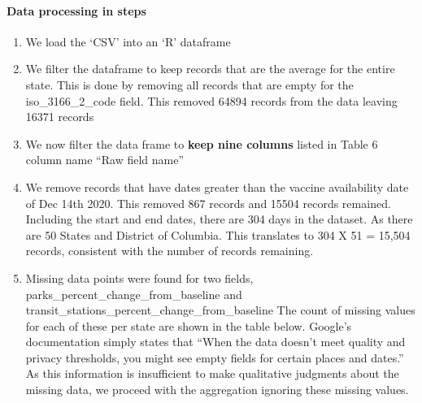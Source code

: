 \documentclass[
]{article}
\providecommand{\tightlist}{%
  \setlength{\itemsep}{0pt}\setlength{\parskip}{0pt}}
\begin{document}
\hypertarget{data-processing-in-steps-2}{%
\paragraph{Data processing in steps}\label{data-processing-in-steps-2}}

\begin{enumerate}
\def\labelenumi{\arabic{enumi}.}
\tightlist
\item
  We load the `CSV' into an `R' dataframe
\item
  We filter the dataframe to keep records that are the average for the
  entire state. This is done by removing all records that are empty for
  the iso\_3166\_2\_code field. This removed 64894 records from the data
  leaving 16371 records
\item
  We now filter the data frame to \textbf{keep nine columns} listed in
  Table 6 column name ``Raw field name''
\item
  We remove records that have dates greater than the vaccine
  availability date of Dec 14th 2020. This removed 867 records and 15504
  records remained. Including the start and end dates, there are 304
  days in the dataset. As there are 50 States and District of Columbia.
  This translates to 304 X 51 = 15,504 records, consistent with the
  number of records remaining.
\item
  Missing data points were found for two fields,
  parks\_percent\_change\_from\_baseline and
  transit\_stations\_percent\_change\_from\_baseline The count of
  missing values for each of these per state are shown in the table
  below. Google's documentation simply states that ``When the data
  doesn't meet quality and privacy thresholds, you might see empty
  fields for certain places and dates.'' As this information is
  insufficient to make qualitative judgments about the missing data, we
  proceed with the aggregation ignoring these missing values.
\end{enumerate}
\end{document}
